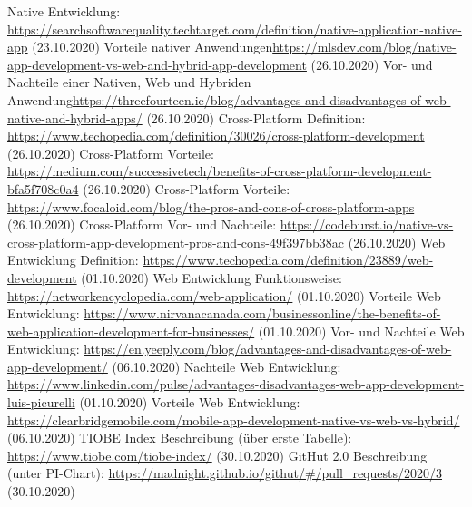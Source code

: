\documentclass[ngerman]{article}
\begin{document}
    \begin{thebibliography}{9}
        Native Entwicklung: \url{https://searchsoftwarequality.techtarget.com/definition/native-application-native-app} (23.10.2020)
        Vorteile nativer Anwendungen\url{https://mlsdev.com/blog/native-app-development-vs-web-and-hybrid-app-development} (26.10.2020)
        Vor- und Nachteile einer Nativen, Web und Hybriden Anwendung\url{https://threefourteen.ie/blog/advantages-and-disadvantages-of-web-native-and-hybrid-apps/} (26.10.2020)
        Cross-Platform Definition: \url{https://www.techopedia.com/definition/30026/cross-platform-development} (26.10.2020)
        Cross-Platform Vorteile: \url{https://medium.com/successivetech/benefits-of-cross-platform-development-bfa5f708c0a4} (26.10.2020)
        Cross-Platform Vorteile: \url{https://www.focaloid.com/blog/the-pros-and-cons-of-cross-platform-apps} (26.10.2020)
        Cross-Platform Vor- und Nachteile: \url{https://codeburst.io/native-vs-cross-platform-app-development-pros-and-cons-49f397bb38ac} (26.10.2020)
        Web Entwicklung Definition: \url{https://www.techopedia.com/definition/23889/web-development} (01.10.2020)
        Web Entwicklung Funktionsweise: \url{https://networkencyclopedia.com/web-application/} (01.10.2020)
        Vorteile Web Entwicklung: \url{https://www.nirvanacanada.com/businessonline/the-benefits-of-web-application-development-for-businesses/} (01.10.2020)
        Vor- und Nachteile Web Entwicklung: \url{https://en.yeeply.com/blog/advantages-and-disadvantages-of-web-app-development/} (06.10.2020)
        Nachteile Web Entwicklung: \url{https://www.linkedin.com/pulse/advantages-disadvantages-web-app-development-luis-picurelli} (01.10.2020)
        Vorteile Web Entwicklung: \url{https://clearbridgemobile.com/mobile-app-development-native-vs-web-vs-hybrid/} (06.10.2020)
        TIOBE Index Beschreibung (über erste Tabelle): \url{https://www.tiobe.com/tiobe-index/} (30.10.2020)
        GitHut 2.0 Beschreibung (unter PI-Chart): \url{https://madnight.github.io/githut/#/pull_requests/2020/3} (30.10.2020)

\end{thebibliography}
\end{document}
